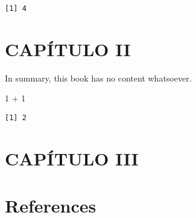 \documentclass[
  letterpaper,
  DIV=11,
  numbers=noendperiod]{scrreprt}
\newenvironment{Shaded}{\begin{snugshade}}{\end{snugshade}}
\newcommand{\DecValTok}[1]{\textcolor[rgb]{0.68,0.00,0.00}{#1}}
\newcommand{\SpecialCharTok}[1]{\textcolor[rgb]{0.37,0.37,0.37}{#1}}
\newlength{\cslhangindent}
\newlength{\cslentryspacingunit} %
\newenvironment{CSLReferences}[2] %
 {%
  \setlength{\parindent}{0pt}
  \ifodd #1
  \let\oldpar\par
  \def\par{\hangindent=\cslhangindent\oldpar}
  \fi
  \setlength{\parskip}{#2\cslentryspacingunit}
 }%
 {}
\begin{document}
\begin{verbatim}
[1] 4
\end{verbatim}


\hypertarget{capuxedtulo-ii}{%
\chapter{CAPÍTULO II}\label{capuxedtulo-ii}}

In summary, this book has no content whatsoever.

\begin{Shaded}
\begin{Highlighting}[]
\DecValTok{1} \SpecialCharTok{+} \DecValTok{1}
\end{Highlighting}
\end{Shaded}

\begin{verbatim}
[1] 2
\end{verbatim}


\hypertarget{capuxedtulo-iii}{%
\chapter{CAPÍTULO III}\label{capuxedtulo-iii}}


\hypertarget{references}{%
\chapter*{References}\label{references}}


\hypertarget{refs}{}
\begin{CSLReferences}{0}{0}
\end{CSLReferences}
\end{document}
